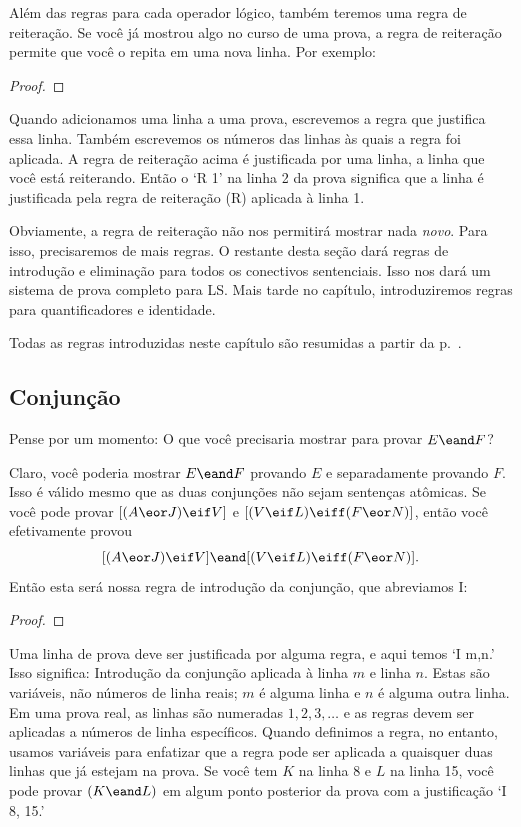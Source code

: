 Além das regras para cada operador lógico, também teremos uma regra de reiteração. Se você já mostrou algo no curso de uma prova, a regra de reiteração permite que você o repita em uma nova linha. Por exemplo:

\begin{proof}
	 
\end{proof}

Quando adicionamos uma linha a uma prova, escrevemos a regra que justifica essa linha. Também escrevemos os números das linhas às quais a regra foi aplicada. A regra de reiteração acima é justificada por uma linha, a linha que você está reiterando. Então o `R 1' na linha 2 da prova significa que a linha é justificada pela regra de reiteração (R) aplicada à linha 1.

Obviamente, a regra de reiteração não nos permitirá mostrar nada \emph{novo}. Para isso, precisaremos de mais regras. O restante desta seção dará regras de introdução e eliminação para todos os conectivos sentenciais. Isso nos dará um sistema de prova completo para LS. Mais tarde no capítulo, introduziremos regras para quantificadores e identidade.

Todas as regras introduzidas neste capítulo são resumidas a partir da p.~\pageref{ProofRules}.


\subsection{Conjunção}

Pense por um momento: O que você precisaria mostrar para provar $E \eand F$?

Claro, você poderia mostrar $E \eand F$ provando $E$ e separadamente provando $F$. 
Isso é válido mesmo que as duas conjunções não sejam sentenças atômicas. Se você pode provar $[(A \eor J) \eif V]$ e  $[(V \eif L) \eiff (F \eor N)]$, então você efetivamente provou
$$[(A \eor J) \eif V] \eand [(V \eif L) \eiff (F \eor N)].$$
Então esta será nossa regra de introdução da conjunção, que abreviamos {\eand}I:

\begin{proof}
	 
\end{proof}

Uma linha de prova deve ser justificada por alguma regra, e aqui temos `{\eand}I m,n.' Isso significa: Introdução da conjunção aplicada à linha $m$ e linha $n$. Estas são variáveis, não números de linha reais; $m$ é alguma linha e $n$ é alguma outra linha. Em uma prova real, as linhas são numeradas $1, 2, 3, \ldots$ e as regras devem ser aplicadas a números de linha específicos. Quando definimos a regra, no entanto, usamos variáveis para enfatizar que a regra pode ser aplicada a quaisquer duas linhas que já estejam na prova. Se você tem $K$ na linha 8 e $L$ na linha 15, você pode provar $(K\eand L)$ em algum ponto posterior da prova com a justificação `{\eand}I 8, 15.'

